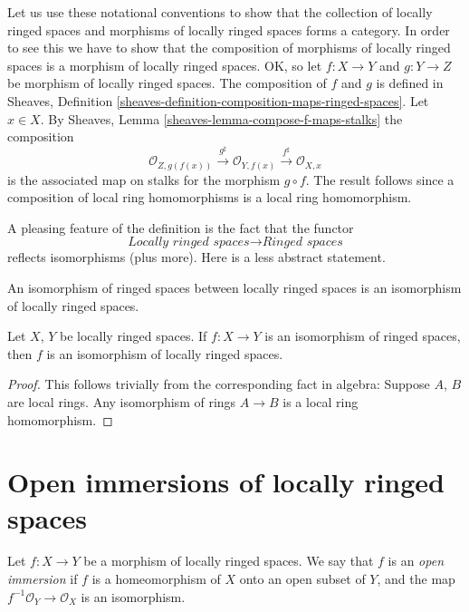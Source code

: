 \medskip\noindent
Let us use these notational conventions to show that the
collection of locally ringed spaces and morphisms of locally
ringed spaces forms a category. In order to see this we have
to show that the composition of morphisms of locally ringed
spaces is a morphism of locally ringed spaces. OK, so let
$f : X \to Y$ and $g : Y \to Z$ be morphism of locally
ringed spaces. The composition of $f$ and $g$ is defined in
Sheaves, Definition \ref{sheaves-definition-composition-maps-ringed-spaces}.
Let $x \in X$. By
Sheaves, Lemma \ref{sheaves-lemma-compose-f-maps-stalks}
the composition
$$
\mathcal{O}_{Z, g(f(x))}
\xrightarrow{g^\sharp}
\mathcal{O}_{Y, f(x)}
\xrightarrow{f^\sharp}
\mathcal{O}_{X, x}
$$
is the associated map on stalks for the morphism $g \circ f$.
The result follows since a composition of local ring
homomorphisms is a local ring homomorphism.

\medskip\noindent
A pleasing feature of the definition is the fact that the functor
$$
\textit{Locally ringed spaces}
\longrightarrow
\textit{Ringed spaces}
$$
reflects isomorphisms (plus more).
Here is a less abstract statement.

\begin{lemma}
\label{lemma-isomorphism-locally-ringed}
\begin{slogan}
An isomorphism of ringed spaces between locally ringed spaces is an
isomorphism of locally ringed spaces.
\end{slogan}
Let $X$, $Y$ be locally ringed spaces.
If $f : X \to Y$ is an isomorphism of
ringed spaces, then $f$ is an isomorphism
of locally ringed spaces.
\end{lemma}

\begin{proof}
This follows trivially from the corresponding fact in algebra:
Suppose $A$, $B$ are local rings. Any isomorphism of rings
$A \to B$ is a local ring homomorphism.
\end{proof}













\section{Open immersions of locally ringed spaces}
\label{section-open-immersion}

\begin{definition}
\label{definition-immersion-locally-ringed-spaces}
Let $f : X \to Y$ be a morphism of locally ringed spaces.
We say that $f$ is an {\it open immersion} if
$f$ is a homeomorphism of $X$ onto an open subset
of $Y$, and the map $f^{-1}\mathcal{O}_Y \to \mathcal{O}_X$
is an isomorphism.
\end{definition}

